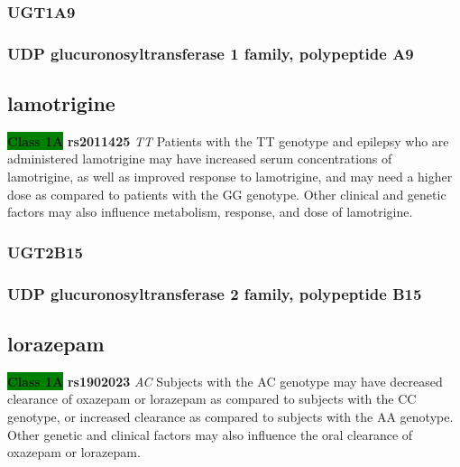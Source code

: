 \documentclass{book}
\begin{document}
\subsubsection{ UGT1A9 }
\subsubsection{ UDP glucuronosyltransferase 1 family, polypeptide A9 }

\subsection{ lamotrigine }


\begin{center}



\textbf{\colorbox{green} {Class 1A}} \textbf{ rs2011425 } \textit{ TT }
Patients with the TT genotype and epilepsy who are administered lamotrigine may have increased serum concentrations of lamotrigine, as well as improved response to lamotrigine, and may need a higher dose as compared to patients with the GG genotype. Other clinical and genetic factors may also influence metabolism, response, and dose of lamotrigine.  

\end{center}






\subsubsection{ UGT2B15 }
\subsubsection{ UDP glucuronosyltransferase 2 family, polypeptide B15 }

\subsection{ lorazepam }


\begin{center}



\textbf{\colorbox{green} {Class 1A}} \textbf{ rs1902023 } \textit{ AC }
Subjects with the AC genotype may have decreased clearance of oxazepam or lorazepam as compared to subjects with the CC genotype, or increased clearance as compared to subjects with the AA genotype. Other genetic and clinical factors may also influence the oral clearance of oxazepam or lorazepam.

\end{center}
\end{document}
